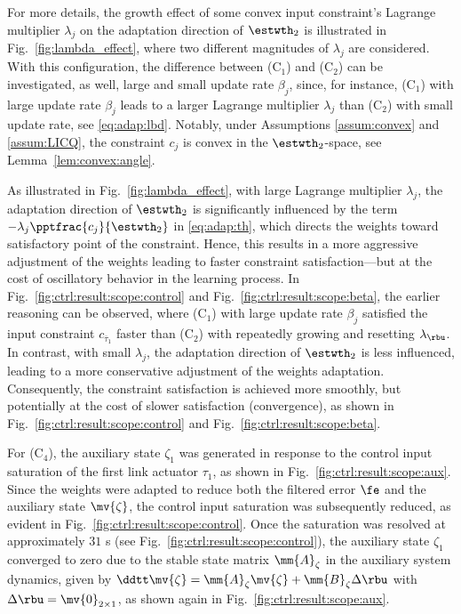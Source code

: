 \documentclass[journal]{IEEEtran}
\begin{document}
For more details, the growth effect of some convex input constraint's Lagrange multiplier $\lambda_j$ on the adaptation direction of $\estwth_2$ is illustrated in Fig.~\ref{fig:lambda_effect}, where two different magnitudes of $\lambda_j$ are considered. 
With this configuration, the difference between (C$_1$) and (C$_2$) can be investigated, as well, \ie large and small update rate $\beta_j$, since, for instance, (C$_1$) with large update rate $\beta_j$ leads to a larger Lagrange multiplier $\lambda_j$ than (C$_2$) with small update rate, see \eqref{eq:adap:lbd}.
Notably, under Assumptions \ref{assum:convex} and \ref{assum:LICQ}, the constraint $c_j$ is convex in the $\estwth_2$-space, see Lemma~\ref{lem:convex:angle}.

As illustrated in Fig.~\ref{fig:lambda_effect}, with large Lagrange multiplier $\lambda_j$, the adaptation direction of $\estwth_2$ is significantly influenced by the term $-\lambda_j\pptfrac{c_j}{\estwth_2}$ in \eqref{eq:adap:th}, which directs the weights toward satisfactory point of the constraint.
Hence, this results in a more aggressive adjustment of the weights leading to faster constraint satisfaction—but at the cost of oscillatory behavior in the learning process.
In Fig.~\ref{fig:ctrl:result:scope:control} and Fig.~\ref{fig:ctrl:result:scope:beta}, the earlier reasoning can be observed, where (C$_1$) with large update rate $\beta_j$ satisfied the input constraint $c_{\overline{\tau}_1}$ faster than (C$_2$) with repeatedly growing and resetting $\lambda_{\rbu}$.
In contrast, with small $\lambda_j$, the adaptation direction of $\estwth_2$ is less influenced, leading to a more conservative adjustment of the weights adaptation.
Consequently, the constraint satisfaction is achieved more smoothly, but potentially at the cost of slower satisfaction (convergence), as shown in Fig.~\ref{fig:ctrl:result:scope:control} and Fig.~\ref{fig:ctrl:result:scope:beta}.

For (C$_4$), the auxiliary state $\zeta_1$ was generated in response to the control input saturation of the first link actuator $\tau_1$, as shown in Fig.~\ref{fig:ctrl:result:scope:aux}.
Since the weights were adapted to reduce both the filtered error $\fe$ and the auxiliary state $\mv{\zeta}$, the control input saturation was subsequently reduced, as evident in Fig.~\ref{fig:ctrl:result:scope:control}.
Once the saturation was resolved at approximately $31$ s (see Fig.~\ref{fig:ctrl:result:scope:control}), the auxiliary state $\zeta_1$ converged to zero due to the stable state matrix $\mm{A}_\zeta$ in the auxiliary system dynamics, given by $\ddtt\mv{\zeta} = \mm{A}_\zeta \mv{\zeta} + \mm{B}_\zeta \Delta\rbu$ with $\Delta\rbu=\mv{0}_{2\times1}$, as shown again in Fig.~\ref{fig:ctrl:result:scope:aux}.
\end{document}
